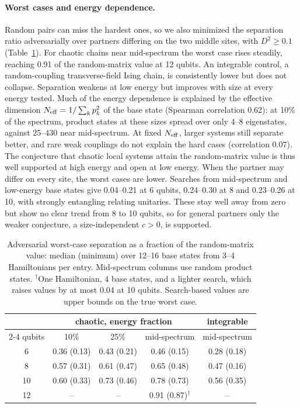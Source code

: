 \documentclass[11pt]{article}
\theoremstyle{definition}
\theoremstyle{remark}
\begin{document}
\paragraph{Worst cases and energy dependence.} Random pairs can miss the hardest ones, so we also minimized the separation ratio adversarially over partners differing on the two middle sites, with $D^2\ge0.1$ (Table~\ref{tab:worst}). For chaotic chains near mid-spectrum the worst case rises steadily, reaching 0.91 of the random-matrix value at 12 qubits. An integrable control, a random-coupling transverse-field Ising chain, is consistently lower but does not collapse. Separation weakens at low energy but improves with size at every energy tested.
Much of the energy dependence is explained by the effective dimension $N_{\rm eff}=1/\sum_kp_k^2$ of the base state (Spearman correlation 0.62): at 10\% of the spectrum, product states at these sizes spread over only 4--8 eigenstates, against 25--430 near mid-spectrum. At fixed $N_{\rm eff}$, larger systems still separate better, and rare weak couplings do not explain the hard cases (correlation 0.07). The conjecture that chaotic local systems attain the random-matrix value is thus well supported at high energy and open at low energy. When the partner may differ on every site, the worst cases are lower. Searches from mid-spectrum and low-energy base states give 0.04--0.21 at 6 qubits, 0.24--0.30 at 8 and 0.23--0.26 at 10, with strongly entangling relating unitaries. These stay well away from zero but show no clear trend from 8 to 10 qubits, so for general partners only the weaker conjecture, a size-independent $c>0$, is supported.

\begin{table}[htbp]\centering\small
\begin{tabular}{ccccc}
\toprule
 & \multicolumn{3}{c}{chaotic, energy fraction} & integrable\\
\cmidrule(lr){2-4}
qubits & 10\% & 25\% & mid-spectrum & mid-spectrum\\
\midrule
6 & 0.36 (0.13) & 0.43 (0.21) & 0.46 (0.15) & 0.28 (0.18)\\
8 & 0.57 (0.31) & 0.61 (0.47) & 0.65 (0.48) & 0.47 (0.16)\\
10 & 0.60 (0.33) & 0.73 (0.46) & 0.78 (0.73) & 0.56 (0.35)\\
12 & -- & -- & 0.91 (0.87)$^\dagger$ & --\\
\bottomrule
\end{tabular}
\caption{Adversarial worst-case separation as a fraction of the random-matrix value: median (minimum) over 12--16 base states from 3--4 Hamiltonians per entry. Mid-spectrum columns use random product states. $^\dagger$One Hamiltonian, 4 base states, and a lighter search, which raises values by at most 0.04 at 10 qubits. Search-based values are upper bounds on the true worst case.}
\label{tab:worst}
\end{table}
\end{document}
